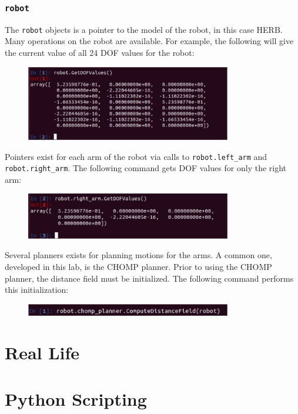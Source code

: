 \documentclass[11pt, oneside]{article}
\begin{document}
\subsubsection{\texttt{robot}}
The \texttt{robot} objects is a pointer to the model of the robot, in this case HERB.  Many operations on the robot are available.  For example, the following will give the current value of all 24 DOF values for the robot:
\begin{figure}[h]
\centering
\includegraphics[width=0.8\textwidth]{figs/getdofvalues.jpg}
\end{figure}

Pointers exist for each arm of the robot via calls to \texttt{robot.left\_arm} and \texttt{robot.right\_arm}.  The following command gets DOF values for only the right arm:
\begin{figure}[h]
\centering
\includegraphics[width=0.8\textwidth]{figs/getrightdofvalues.jpg}
\end{figure}

Several planners exists for planning motions for the arms.  A common one, developed in this lab, is the CHOMP planner.  Prior to using the CHOMP planner, the distance field must be initialized.  The following command performs this initialization:
\begin{figure}[h]
\centering
\includegraphics[width=0.8\textwidth]{figs/chompinitialize.jpg}
\end{figure}



\section{Real Life}

\section{Python Scripting}
\end{document}

